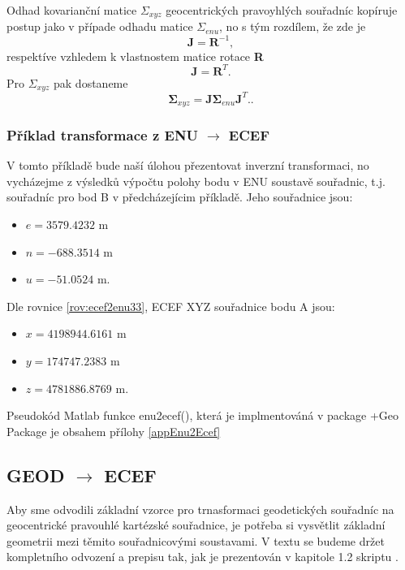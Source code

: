 \documentclass[11pt,a4paper]{article}
\begin{document}
Odhad kovarianční matice $\Sigma_{xyz}$ geocentrických pravoyhlých souřadníc kopíruje postup jako v případe odhadu matice $\Sigma_{enu}$, no s tým rozdílem, že zde je 
\begin{equation}
\mathbf{J} = \mathbf{R}^{-1},
\end{equation}
respektíve vzhledem k vlastnostem matice rotace \textbf{R}
\begin{equation}
\mathbf{J} = \mathbf{R}^{T}.
\end{equation}
Pro $\Sigma_{xyz}$ pak dostaneme
\begin{equation}
\mathbf{\Sigma}_{xyz} = \mathbf{J}\mathbf{\Sigma}_{enu}\mathbf{J}^{T}..
\end{equation}

\subsubsection{Příklad transformace z ENU $\rightarrow$ ECEF}

V tomto příkladě bude naší úlohou přezentovat inverzní transformaci, no vycházejme z výsledků výpočtu polohy bodu v ENU soustavě souřadnic, t.j. souřadníc pro bod B v předcházejícim příkladě. Jeho souřadnice jsou:

\begin{itemize}
\item $e = 3579.4232$ m
\item $n = -688.3514$ m
\item $u = -51.0524$ m.
\end{itemize}


Dle rovnice \ref{rov:ecef2enu33}, ECEF XYZ souřadnice bodu A jsou:
\begin{itemize}
\item $x = 4198944.6161$ m
\item $y = 174747.2383$ m
\item $z = 4781886.8769$ m.
\end{itemize}

Pseudokód Matlab funkce enu2ecef(), která je implmentováná v package +Geo Package je obsahem přílohy \ref{appEnu2Ecef}

\subsection{GEOD $\rightarrow$ ECEF}

Aby sme odvodili základní vzorce pro trnasformaci geodetických souřadníc na geocentrické pravouhlé kartézské souřadnice, je potřeba si vysvětlit základní geometrii mezi těmito souřadnicovými soustavami. V textu se budeme držet kompletního odvození a prepisu tak, jak je prezentován v kapitole 1.2 skriptu \cite{Cimbalnik1997}.
\end{document}
